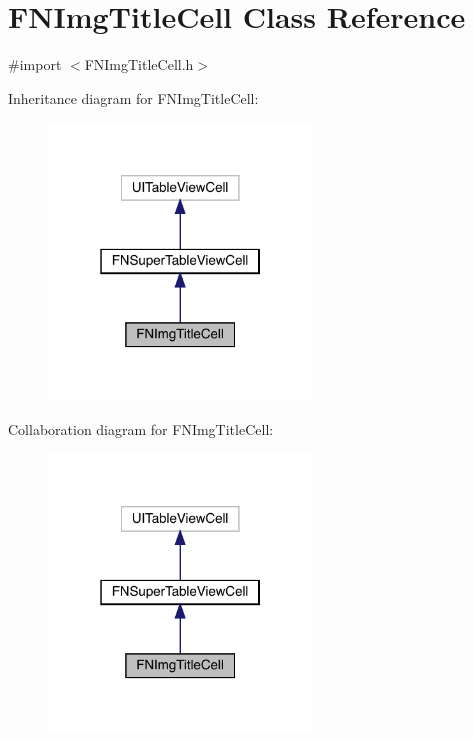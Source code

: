 \hypertarget{interface_f_n_img_title_cell}{}\section{F\+N\+Img\+Title\+Cell Class Reference}
\label{interface_f_n_img_title_cell}


{\ttfamily \#import $<$F\+N\+Img\+Title\+Cell.\+h$>$}



Inheritance diagram for F\+N\+Img\+Title\+Cell\+:\nopagebreak
\begin{figure}[H]
\begin{center}
\leavevmode
\includegraphics[width=199pt]{interface_f_n_img_title_cell__inherit__graph}
\end{center}
\end{figure}


Collaboration diagram for F\+N\+Img\+Title\+Cell\+:\nopagebreak
\begin{figure}[H]
\begin{center}
\leavevmode
\includegraphics[width=199pt]{interface_f_n_img_title_cell__coll__graph}
\end{center}
\end{figure}
